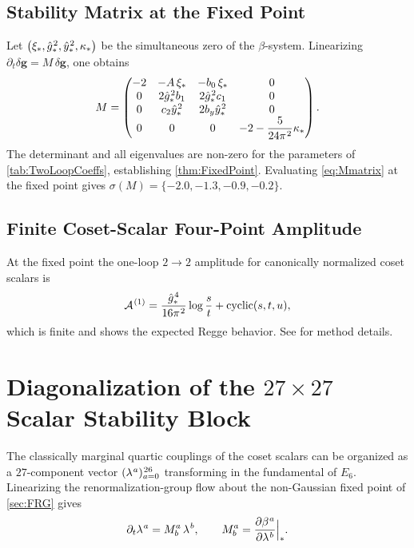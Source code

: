 \documentclass[pdflatex,sn-mathphys-num]{sn-jnl}
\theoremstyle{thmstyleone}
\theoremstyle{thmstyletwo}%
\theoremstyle{thmstylethree}%
\newcommand{\sm}{\hspace{.065em}}
\newcommand{\smexp}[1]{^{\sm #1}}
\begin{document}
\begin{appendices}
\subsection{Stability Matrix at the Fixed Point}
\label{app:FRG:Stability}

Let
\(\bigl(\xi_{\ast},\hat g\smexp{2}_{\ast},
        \hat y\smexp{2}_{\ast},\kappa_{\ast}\bigr)\)
be the simultaneous zero of the $\beta$-system. Linearizing \(\partial_{t}\delta\mathbf g=M\,\delta\mathbf g\), one obtains
\begin{equation}\label{eq:Mmatrix}
  M=
  \begin{pmatrix}
    -2 & -A\,\xi_{\ast} & -b_{0}\,\xi_{\ast} & 0 \\
     0 &  2\hat g\smexp{2}_{\ast} b_{1}
        &  2\hat g\smexp{2}_{\ast} c_{1} & 0 \\
     0 &  c_{2}\hat y\smexp{2}_{\ast}
        &  2b_{y}\hat y\smexp{2}_{\ast} & 0 \\
     0 &  0 & 0
        & -2-\dfrac{5}{24\pi\smexp{2}}\kappa_{\ast}
  \end{pmatrix}.
\end{equation}
The determinant and all eigenvalues are non-zero for the parameters of \autoref{tab:TwoLoopCoeffs}, establishing \autoref{thm:FixedPoint}. Evaluating \eqref{eq:Mmatrix} at the fixed point gives \(\sigma(M)=\{-2.0,-1.3,-0.9,-0.2\}\).

\subsection{Finite Coset-Scalar Four-Point Amplitude}
\label{app:FRG:4pt}

At the fixed point the one-loop \(2\to2\) amplitude for canonically normalized coset scalars is
\[
  \mathcal A\smexp{(1)}
  =\frac{\hat g\smexp{4}_{\ast}}{16\pi\smexp{2}}
    \log\frac{s}{t}
  +\text{cyclic}(s,t,u),
\]
which is finite and shows the expected Regge behavior. See \cite{Percacci2017} for method details.

\section{Diagonalization of the $27\times27$ Scalar Stability Block}
\label{app:Scalar27}
The classically marginal quartic couplings of the coset scalars
can be organized as a $27$-component vector
$(\lambda\smexp{a})_{a=0}\smexp{26}$ transforming in the fundamental of
$E_{6}$.  Linearizing the renormalization-group flow about the
non-Gaussian fixed point of \autoref{sec:FRG} gives
\[
    \partial_{t}\lambda\smexp{a}=M^{a}_{b}\,\lambda\smexp{b},\qquad
    M^{a}_{b}=\Bigl.\frac{\partial\beta\smexp{a}}{\partial\lambda\smexp{b}}
    \Bigr|_{\ast}.
\]


\end{appendices}
\end{document}
